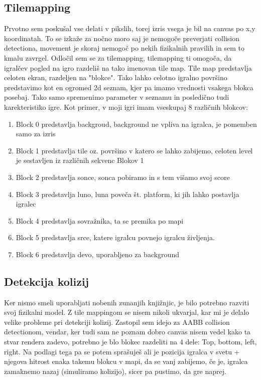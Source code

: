 \documentclass[a4paper,11pt]{article}
\begin{document}
\subsection{Tilemapping}

Prvotno sem poskušal vse delati v pikslih, torej izris vsega je bil na canvas po x,y koordinatah. To se izkaže za nočno moro saj je nemogoče preverjati collision detectiona, movement je skoraj nemogoč po nekih fizikalnih pravilih in sem to kmalu zavrgel. 
Odločil sem se za tilemapping, tilemapping ti omogoča, da igralčev pogled na igro razdeliš na tako imenovan tile map. Tile map predstavlja celoten ekran, razdeljen na "blokce". Tako lahko celotno igralno površino predstavimo kot en ogromed 2d seznam, kjer pa imamo vrednosti vsakega blokca posebaj. Tako samo spremenimo parameter v seznamu in posledično tudi karekteristiko igre. Kot primer, v moji igri imam vseskupaj 8 različnih blokcov:
\begin{enumerate}
	\item Block 0 predstavlja backgroud, background ne vpliva na igralca, je pomemben samo za izris
	\item Block 1 predstavlja tile oz. površino v katero se lahko zabijemo, celoten level je sestavljen iz
	različnih sekvenc Blokov 1
	\item Block 2 predstavlja sonce, sonca pobiramo in s tem višamo svoj score
	\item Block 3 predstavlja luno, luna poveča št. platform, ki jih lahko postavlja igralec
	\item Block 4 predstavlja sovražnika, ta se premika po mapi
	\item Block 5 predstavlja srce, katere igralcu povnejo igralcu življenja.
	\item Block 6 predstavlja devo, uporabljeno za background
\end{enumerate}
\pagebreak
\subsection{Detekcija kolizij}

Ker nismo smeli uporabljati nobenih zunanjih knjižnjic, je bilo potrebno razviti svoj fizikalni model. Z tile mappingom se nisem nikoli ukvarjal, kar mi je delalo velike probleme pri detekciji kolizij. Zastopil sem idejo za AABB collision detectionom, vendar, ker tudi sam ne poznam dobro canvas nisem vedel kako ta stvar rendera zadevo, potrebno je blo blokec razdeliti na 4 dele: Top, bottom, left, right. Na podlagi tega pa se potem sprašuješ ali je pozicija igralca v svetu + njegova hitrost enaka takemu blokcu v mapi, da se vanj zabijemo, če je, igralca zamaknemo nazaj (simuliramo kolizijo), sicer pa pustimo, da gre naprej.
\end{document}
